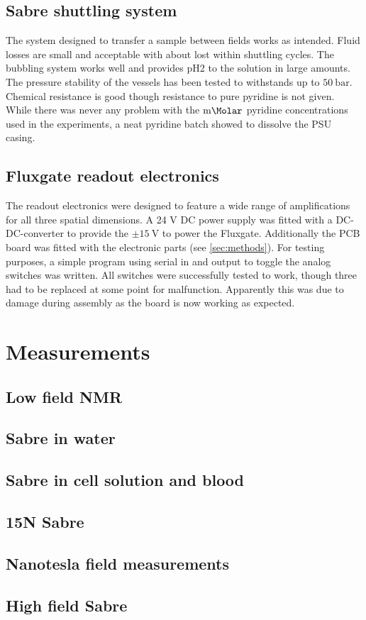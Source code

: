 	\subsection{Sabre shuttling system}
		The system designed to transfer a sample between fields works as intended. Fluid losses are
		small and acceptable with about  lost within  shuttling cycles. The
		bubbling system works well and provides pH2 to the solution in large amounts. The pressure
		stability of the vessels has been tested to withstands up to $\SI{50}{\bar}$. Chemical
		resistance is good though resistance to pure pyridine is not given. While there was never
		any problem with the $\SI{}{\milli\Molar}$ pyridine concentrations used in the experiments, a
		neat pyridine batch showed to dissolve the PSU casing.
	\subsection{Fluxgate readout electronics}
		The readout electronics were designed to feature a wide range of amplifications for all
		three spatial dimensions. A 24 V DC power supply was fitted with a DC-DC-converter to
		provide the $\pm\SI{15}{\volt}$ to power the Fluxgate. Additionally the PCB board was fitted
		with the electronic parts (see \ref{sec:methods}). For testing purposes, a simple program
		using serial in and output to toggle the analog switches was written. All switches were
		successfully tested to work, though three had to be replaced at some point for malfunction.
		Apparently this was due to damage during assembly as the board is now working as expected.
\section{Measurements}
	\subsection{Low field NMR}
	\subsection{Sabre in water}
	\subsection{Sabre in cell solution and blood}
	\subsection{15N Sabre}
	\subsection{Nanotesla field measurements}
	\subsection{High field Sabre}

%

